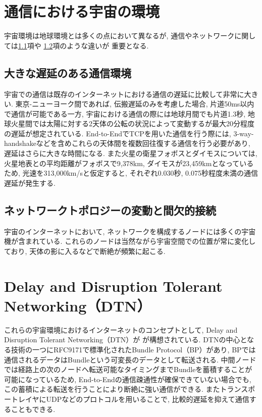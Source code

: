 \section{通信における宇宙の環境}
\label{section:通信における宇宙の環境}
宇宙環境は地球環境とは多くの点において異なるが, 
通信やネットワークに関しては\ref{section:大きな遅延のある通信環境}項や
\ref{section:ネットワークトポロジーの変動と間欠的接続}項のような違いが
重要となる. 


\subsection{大きな遅延のある通信環境}
\label{section:大きな遅延のある通信環境}
宇宙での通信は既存のインターネットにおける通信の遅延に比較して非常に大きい. 
東京-ニューヨーク間であれば, 伝搬遅延のみを考慮した場合, 片道50ms以内で通信が可能である一方, 宇宙における通信の際には地球月間でも片道1.3秒, 
地球火星間では太陽に対する2天体の公転の状況によって変動するが最大20分程度の遅延が想定されている. 
End-to-EndでTCPを用いた通信を行う際には,  3-way-handshakeなどを含めこれらの天体間を複数回往復する通信を行う必要があり,  
遅延はさらに大きな時間になる.  
\cite{McBrayer2022}
また火星の衛星フォボスとダイモスについては, 
火星地表との平均距離がフォボスで9,378km, ダイモスが23,459kmとなっているため, 
光速を313,000km/sと仮定すると, それぞれ0.030秒, 0.075秒程度未満の通信遅延が発生する. 


\subsection{ネットワークトポロジーの変動と間欠的接続}
\label{section:ネットワークトポロジーの変動と間欠的接続}
宇宙のインターネットにおいて, ネットワークを構成するノードには多くの宇宙機が含まれている. 
これらのノードは当然ながら宇宙空間での位置が常に変化しており, 
 天体の影に入るなどで断絶が頻繁に起こる.  

\section{Delay and Disruption Tolerant Networking（DTN）}
これらの宇宙環境におけるインターネットのコンセプトとして, Delay and Disruption Tolerant Networking（DTN）が
が構想されている. DTNの中心となる技術の一つにRFC9171\cite{rfc9171}で標準化されたBundle Protocol（BP）があり,  
BPでは通信されるデータはBundleという可変長のデータとして転送される.  
中間ノードでは経路上の次のノードへ転送可能なタイミングまでBundleを蓄積することが可能になっているため,  
End-to-Endの通信疎通性が確保できていない場合でも,  この蓄積による転送を行うことにより断絶に強い通信ができる. 
またトランスポートレイヤにUDPなどのプロトコルを用いることで,  比較的遅延を抑えて通信することもできる. \cite{bundle_protocol_architecture}

